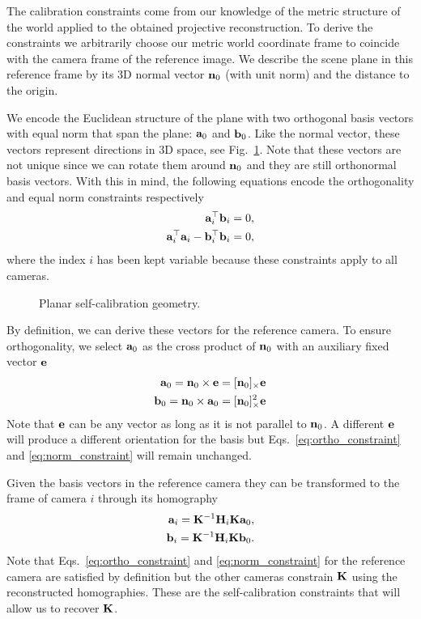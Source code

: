 \documentclass[10pt,twocolumn,letterpaper]{article}
\begin{document}
The calibration constraints come from our knowledge of the metric structure of the world applied to the obtained projective reconstruction. To derive the constraints we arbitrarily choose our metric world coordinate frame to coincide with the camera frame of the reference image. We describe the scene plane in this reference frame by its 3D normal vector $\mathbf{n}_0$ (with unit norm) and the distance to the origin.

We encode the Euclidean structure of the plane with two orthogonal basis vectors with equal norm that span the plane: $\mathbf{a}_0$ and $\mathbf{b}_0$. Like the normal vector, these vectors represent directions in 3D space, see Fig.~\ref{fig:planar_structure}. Note that these vectors are not unique since we can rotate them around $\mathbf{n}_0$ and they are still orthonormal basis vectors. With this in mind, the following equations encode the orthogonality and equal norm constraints respectively
\begin{align}
\mathbf{a}_i^\top \mathbf{b}_i = 0, \label{eq:ortho_constraint} \\
\mathbf{a}_i^\top \mathbf{a}_i - \mathbf{b}_i^\top \mathbf{b}_i = 0, \label{eq:norm_constraint}
\end{align}
where the index $i$ has been kept variable because these constraints apply to all cameras.

\begin{figure}
\centering

\caption{Planar self-calibration geometry.}
\label{fig:planar_structure}
\end{figure}

By definition, we can derive these vectors for the reference camera. To ensure orthogonality, we select $\mathbf{a}_0$ as the cross product of $\mathbf{n}_0$ with an auxiliary fixed vector $\mathbf{e}$
\begin{align}
\mathbf{a}_0 = \mathbf{n}_0 \times \mathbf{e} = [\mathbf{n}_0]_\times \mathbf{e} \\
\mathbf{b}_0 = \mathbf{n}_0 \times \mathbf{a}_0 = [\mathbf{n}_0]_\times^2 \mathbf{e}
\end{align}
Note that $\mathbf{e}$ can be any vector as long as it is not parallel to $\mathbf{n}_0$. A different $\mathbf{e}$ will produce a different orientation for the basis but Eqs.~\eqref{eq:ortho_constraint} and \eqref{eq:norm_constraint} will remain unchanged.

Given the basis vectors in the reference camera they can be transformed to the frame of camera $i$ through its homography
\begin{align}
\mathbf{a}_i = \mathbf{K}^{-1} \mathbf{H}_i \mathbf{K} \mathbf{a}_0, \\
\mathbf{b}_i = \mathbf{K}^{-1} \mathbf{H}_i \mathbf{K} \mathbf{b}_0.
\end{align}
%
Note that Eqs.~\eqref{eq:ortho_constraint} and \eqref{eq:norm_constraint} for the reference camera are satisfied by definition but the other cameras constrain $\mathbf{K}$ using the reconstructed homographies. These are the self-calibration constraints that will allow us to recover $\mathbf{K}$.
\end{document}
